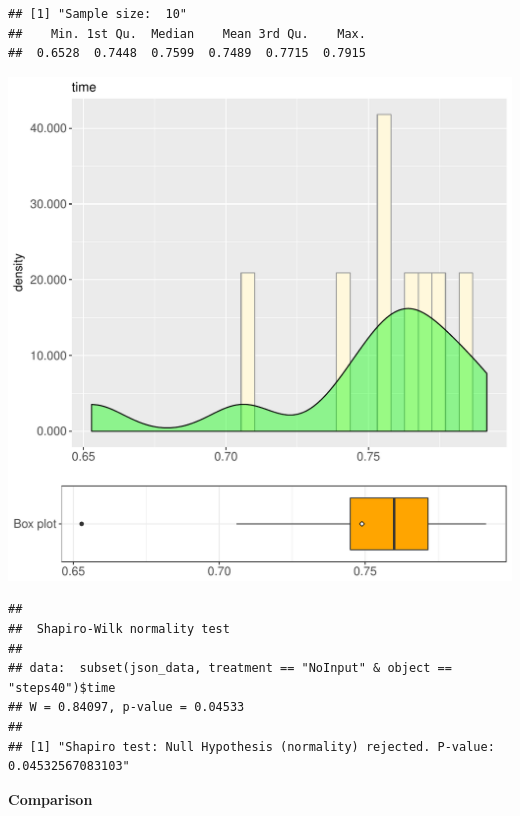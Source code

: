 \documentclass{article}\usepackage[]{graphicx}\usepackage[]{color}
\makeatletter
\def\maxwidth{ %
  \ifdim\Gin@nat@width>\linewidth
    \linewidth
  \else
    \Gin@nat@width
  \fi
}
\newenvironment{kframe}{%
 \def\at@end@of@kframe{}%
 \ifinner\ifhmode%
  \def\at@end@of@kframe{\end{minipage}}%
  \begin{minipage}{\columnwidth}%
 \fi\fi%
 \def\FrameCommand##1{\hskip\@totalleftmargin \hskip-\fboxsep
 \colorbox{shadecolor}{##1}\hskip-\fboxsep
     \hskip-\linewidth \hskip-\@totalleftmargin \hskip\columnwidth}%
 \MakeFramed {\advance\hsize-\width
   \@totalleftmargin\z@ \linewidth\hsize
   \@setminipage}}%
 {\par\unskip\endMakeFramed%
 \at@end@of@kframe}
\newenvironment{knitrout}{}{} %
\makeatother
\begin{document}
\begin{knitrout}
\color{fgcolor}\begin{kframe}
\begin{verbatim}
## [1] "Sample size:  10"
##    Min. 1st Qu.  Median    Mean 3rd Qu.    Max. 
##  0.6528  0.7448  0.7599  0.7489  0.7715  0.7915
\end{verbatim}
\end{kframe}
\includegraphics[width=\maxwidth]{figure/RH4_NoInput_steps40-1} 
\begin{kframe}\begin{verbatim}
## 
## 	Shapiro-Wilk normality test
## 
## data:  subset(json_data, treatment == "NoInput" & object == "steps40")$time
## W = 0.84097, p-value = 0.04533
## 
## [1] "Shapiro test: Null Hypothesis (normality) rejected. P-value: 0.04532567083103"
\end{verbatim}
\end{kframe}
\end{knitrout}
  
 \textbf{Comparison}
  
\end{document}

